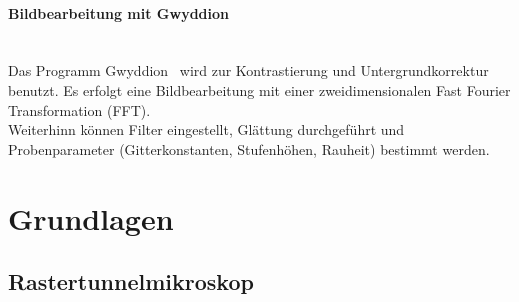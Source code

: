 \documentclass[a4paper,twoside,final]{article}
\begin{document}
\paragraph{Bildbearbeitung mit Gwyddion}$~$\\
Das Programm Gwyddion~\cite{Gwyddion} wird zur Kontrastierung und Untergrundkorrektur benutzt. Es erfolgt eine Bildbearbeitung mit einer zweidimensionalen Fast Fourier Transformation (FFT).\\
Weiterhinn können Filter eingestellt, Glättung durchgeführt und Probenparameter (Gitterkonstanten, Stufenhöhen, Rauheit) bestimmt werden.
\newpage
\section{Grundlagen} \label{sec:Grundlagen}
\subsection{Rastertunnelmikroskop}
\end{document}
